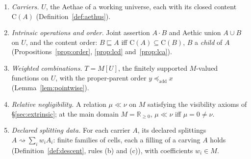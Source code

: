 \begin{enumerate}
\item[(D1)] \emph{Carriers.} $U$, the Aethae of a working universe, each with its closed content $\mathrm{C}(A)$ (Definition~\ref{def:aethus}).
\item[(D2)] \emph{Intrinsic operations and order.} Joint assertion $A \cdot B$ and Aethic union $A \cup B$ on $U$, and the content order: $B \sqsubseteq A$ iff $\mathrm{C}(A) \subseteq \mathrm{C}(B)$, $B$ a \emph{child} of $A$ (Propositions~\ref{prop:order}, \ref{prop:lcd} and~\ref{prop:lca}).
\item[(D3)] \emph{Weighted combinations.} $T = M[U]$, the finitely supported $M$-valued functions on $U$, with the proper-parent order $y \preceq_{\mathrm{add}} x$ (Lemma~\ref{lem:pointwise}).
\item[(D4)] \emph{Relative negligibility.} A relation $\mu \ll \nu$ on $M$ satisfying the visibility axioms of \S\ref{sec:extrinsic}; at the main domain $M = \mathbb{R}_{\ge 0}$, $\mu \ll \nu$ iff $\mu = 0 \ne \nu$.
\item[(D5)] \emph{Declared splitting data.} For each carrier $A$, its declared splittings $A \rightsquigarrow \sum_i w_i A_i$: finite families of cells, each a filling of a carving $A$ holds (Definition~\ref{def:descent}, rules (b) and (c)), with coefficients $w_i \in M$.

\end{enumerate}
